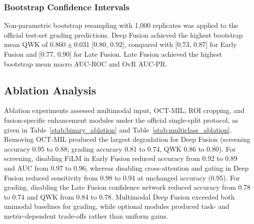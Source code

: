 \documentclass{ieeeaccess}
\begin{document}
\subsubsection{Bootstrap Confidence Intervals}
\label{subsubsec:grading_bootstrap}

Non-parametric bootstrap resampling with 1,000 replicates was applied to the official test-set grading predictions. %
Deep Fusion achieved the highest bootstrap mean QWK of $0.860\pm0.031$ [0.80, 0.92], compared with [0.73, 0.87] for Early Fusion and [0.77, 0.90] for Late Fusion. Late Fusion achieved the highest bootstrap mean macro AUC-ROC and OvR AUC-PR. %

\subsection{Ablation Analysis}
\label{subsec:ablation_results}

Ablation experiments assessed multimodal input, OCT-MIL, ROI cropping, and fusion-specific enhancement modules under the official single-split protocol, as given in Table~\ref{stab:binary_ablation} and Table~\ref{stab:multiclass_ablation}. Removing OCT-MIL produced the largest degradation for Deep Fusion (screening accuracy 0.95 to 0.88; grading accuracy 0.81 to 0.74, QWK 0.86 to 0.80). For screening, disabling FiLM in Early Fusion reduced accuracy from 0.92 to 0.89 and AUC from 0.97 to 0.96, whereas disabling cross-attention and gating in Deep Fusion reduced sensitivity from 0.98 to 0.94 at unchanged accuracy (0.95). For grading, disabling the Late Fusion confidence network reduced accuracy from 0.78 to 0.74 and QWK from 0.84 to 0.78. Multimodal Deep Fusion exceeded both unimodal baselines for grading, while optional modules produced task- and metric-dependent trade-offs rather than uniform gains.
\end{document}
